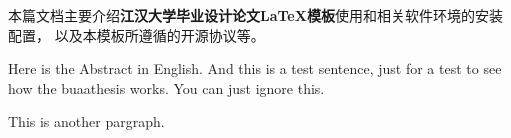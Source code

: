 
\begin{chineseabstract}
本篇文档主要介绍{\bf 江汉大学毕业设计论文\LaTeX{}模板}使用和相关软件环境的安装配置，
以及本模板所遵循的开源协议等。
\end{chineseabstract}

\begin{englishabstract}
Here is the Abstract in English. And this is a test sentence,
just for a test to see how the buaathesis works. You can just ignore this.\par
This is another pargraph.
\end{englishabstract}